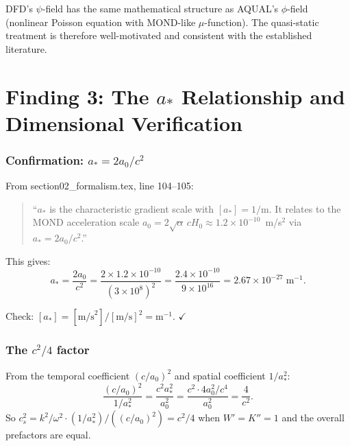 \documentclass[11pt]{article}
\newcommand{\ee}[1]{\times 10^{#1}}
\begin{document}
DFD's $\psi$-field has the same mathematical structure as AQUAL's $\phi$-field
(nonlinear Poisson equation with MOND-like $\mu$-function). The quasi-static
treatment is therefore well-motivated and consistent with the established
literature.


\part{Finding 3: The $a_*$ Relationship and Dimensional Verification}
\label{part:astar}

\section{Confirmation: $a_* = 2a_0/c^2$}

From section02\_formalism.tex, line 104--105:
\begin{quote}
``$a_*$ is the characteristic gradient scale with $[a_*] = 1/\text{m}$.
It relates to the MOND acceleration scale $a_0 = 2\sqrt{\alpha}\,cH_0
\approx 1.2 \times 10^{-10}$~m/s$^2$ via $a_* = 2a_0/c^2$.''
\end{quote}

This gives:
\begin{equation}
a_* = \frac{2a_0}{c^2} = \frac{2 \times 1.2\ee{-10}}{(3\ee{8})^2}
= \frac{2.4\ee{-10}}{9\ee{16}} = 2.67\ee{-27}\;\text{m}^{-1}.
\end{equation}

Check: $[a_*] = [\text{m/s}^2]/[\text{m/s}]^2 = \text{m}^{-1}$. $\checkmark$

\section{The $c^2/4$ factor}

From the temporal coefficient $(c/a_0)^2$ and spatial coefficient $1/a_*^2$:
\begin{equation}
\frac{(c/a_0)^2}{1/a_*^2} = \frac{c^2 a_*^2}{a_0^2}
= \frac{c^2 \cdot 4a_0^2/c^4}{a_0^2} = \frac{4}{c^2}.
\end{equation}
So $c_s^2 = k^2/\omega^2 \cdot (1/a_*^2)/((c/a_0)^2) = c^2/4$
when $W' = K'' = 1$ and the overall prefactors are equal.
\end{document}
